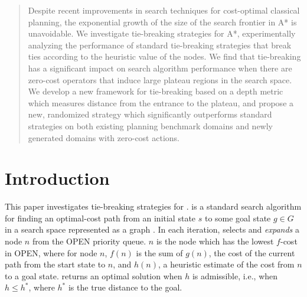 


\begin{abstract}
Despite recent improvements in search techniques
for cost-optimal classical planning, the exponential growth of
the size of the search frontier in A* is unavoidable.
We investigate tie-breaking strategies for A*, 
experimentally analyzing the performance of standard tie-breaking strategies that break ties according to the heuristic value of the nodes.
We find that tie-breaking has a significant impact on search algorithm performance when there are zero-cost operators that induce large plateau regions in the search space.
We develop a new framework for tie-breaking based on a depth metric which measures distance from the entrance to the plateau, and propose a new, randomized strategy which significantly outperforms standard strategies on both existing planning benchmark domains and newly generated domains with zero-cost actions.

\end{abstract}

\section{Introduction}
\label{sec-1}


This paper investigates tie-breaking strategies for \astar.
\astar is a standard search algorithm for finding an optimal-cost path 
from an initial state $s$ to some goal state $g \in G$ in a search space represented as a graph \cite{hart1968formal}.
In each iteration, \astar selects and \emph{expands} a node $n$ from the OPEN priority queue.
$n$ is the node which has the lowest $f$-cost in OPEN, where for node $n$, $f(n)$ is the sum of  $g(n)$, the cost of the current path from the start state to $n$, and $h(n)$, a heuristic estimate of the cost from $n$ to a goal state.
\astar returns an optimal solution when $h$ is admissible, i.e., when $h \leq h^*$, where $h^*$ is the true distance to the goal.


